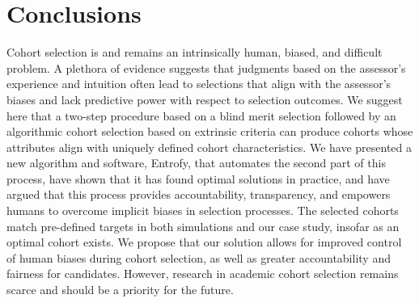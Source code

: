 \documentclass[10pt,letterpaper]{article}
\begin{document}
\section*{Conclusions}

Cohort selection is and remains an intrinsically human, biased, and difficult problem.
A plethora of evidence suggests that judgments based on the assessor's experience and intuition often lead to selections that align with the assessor's biases and lack predictive power with respect to selection outcomes.
We suggest here that a two-step procedure based on a blind merit selection followed by an algorithmic cohort selection based on extrinsic criteria can produce cohorts whose attributes align with uniquely defined cohort characteristics.
We have presented a new algorithm and software, Entrofy, that automates the second part of this process, have shown that it has found optimal solutions in practice, and have argued that this process provides accountability, transparency, and empowers humans to overcome implicit biases in selection processes.
The selected cohorts match pre-defined targets in both simulations and our case study, insofar as an optimal cohort exists.
We propose that our solution allows for improved control of human biases during cohort selection, as well as greater accountability and fairness for candidates.
However, research in academic cohort selection remains scarce and should be a priority for the future. 





\end{document}

